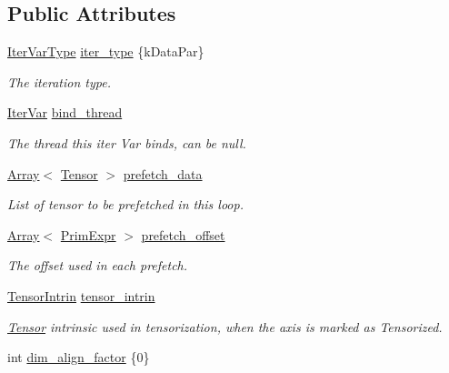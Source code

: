 \subsection*{Public Attributes}
\begin{DoxyCompactItemize}
\item 
\hyperlink{namespacetvm_1_1tir_add7d0a6b1dd91f0c3c5dd2f4cf64358e}{Iter\+Var\+Type} \hyperlink{classtvm_1_1te_1_1IterVarAttrNode_a117f5272600ac61f86dd110961e384bc}{iter\+\_\+type} \{k\+Data\+Par\}
\begin{DoxyCompactList}\small\item\em The iteration type. \end{DoxyCompactList}\item 
\hyperlink{classtvm_1_1tir_1_1IterVar}{Iter\+Var} \hyperlink{classtvm_1_1te_1_1IterVarAttrNode_a8bd9e6a5cf8ce894eddee84a8cc98bfd}{bind\+\_\+thread}
\begin{DoxyCompactList}\small\item\em The thread this iter Var binds, can be null. \end{DoxyCompactList}\item 
\hyperlink{classtvm_1_1Array}{Array}$<$ \hyperlink{classtvm_1_1te_1_1Tensor}{Tensor} $>$ \hyperlink{classtvm_1_1te_1_1IterVarAttrNode_a0cd129334ac1bc8d6461fb06be67e731}{prefetch\+\_\+data}
\begin{DoxyCompactList}\small\item\em List of tensor to be prefetched in this loop. \end{DoxyCompactList}\item 
\hyperlink{classtvm_1_1Array}{Array}$<$ \hyperlink{classtvm_1_1PrimExpr}{Prim\+Expr} $>$ \hyperlink{classtvm_1_1te_1_1IterVarAttrNode_a2a4a8e201e6caefeecffd4a7647866fd}{prefetch\+\_\+offset}
\begin{DoxyCompactList}\small\item\em The offset used in each prefetch. \end{DoxyCompactList}\item 
\hyperlink{classtvm_1_1te_1_1TensorIntrin}{Tensor\+Intrin} \hyperlink{classtvm_1_1te_1_1IterVarAttrNode_a6a0d96bbebfd716f851b2ad01738cb3f}{tensor\+\_\+intrin}
\begin{DoxyCompactList}\small\item\em \hyperlink{classtvm_1_1te_1_1Tensor}{Tensor} intrinsic used in tensorization, when the axis is marked as Tensorized. \end{DoxyCompactList}\item 
int \hyperlink{classtvm_1_1te_1_1IterVarAttrNode_a8d3c51e9b50ef1d3e10453b3210d187a}{dim\+\_\+align\+\_\+factor} \{0\}

\end{DoxyCompactItemize}
